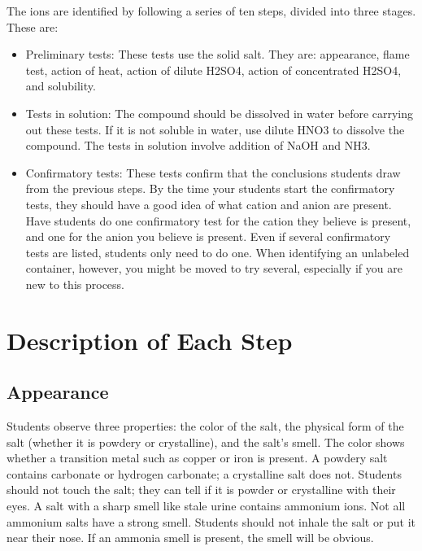 The ions are identified by following a series of ten steps, 
divided into three stages. 
These are:
\begin{itemize}
\item{Preliminary tests:
These tests use the solid salt. 
They are: appearance, 
flame test, 
action of heat, 
action of dilute H2SO4, 
action of concentrated H2SO4, 
and solubility.}
\item{Tests in solution:
The compound should be dissolved in water before carrying out these tests. 
If it is not soluble in water, 
use dilute HNO3 to dissolve the compound. 
The tests in solution involve addition of NaOH and NH3.}
\item{Confirmatory tests:
These tests confirm that the conclusions students draw from the previous steps. 
By the time your students start the confirmatory tests, 
they should have a good idea of what cation and anion are present. 
Have students do one confirmatory test for the cation they believe is present, 
and one for the anion you believe is present. 
Even if several confirmatory tests are listed, 
students only need to do one. 
When identifying an unlabeled container, 
however, 
you might be moved to try several, 
especially if you are new to this process.}
\end{itemize}

\section{Description of Each Step}
\subsection{Appearance}
Students observe three properties: the color of the salt, 
the physical form of the salt (whether it is powdery or crystalline), 
and the salt’s smell. 
The color shows whether a transition metal such as copper 
or iron is present. 
A powdery salt contains carbonate or hydrogen carbonate; 
a crystalline salt does not. 
Students should not touch the salt; 
they can tell if it is powder or crystalline with their eyes. 
A salt with a sharp smell like stale urine contains ammonium ions. 
Not all ammonium salts have a strong smell. 
Students should not inhale the salt or put it near their nose. 
If an ammonia smell is present, 
the smell will be obvious.

